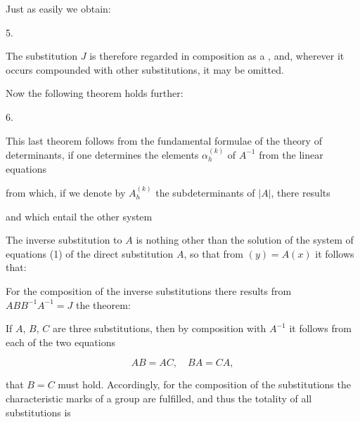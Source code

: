 Just as easily we obtain:

\par
5.\enspace{}

The substitution $J$ is therefore regarded in composition as a , and, wherever it occurs compounded with other substitutions, it may be omitted.

Now the following theorem holds further:

\par
6.\enspace{}



This last theorem follows from the fundamental formulae of the theory of determinants, if one determines the elements $\alpha_h^{(k)}$ of $A^{-1}$ from the linear equations


from which, if we denote by $A_h^{(k)}$ the subdeterminants of $|A|$, there results


and which entail the other system


The inverse substitution to $A$ is nothing other than the solution of the system of equations (1) of the direct substitution $A$, so that from $(y) = A(x)$ it follows that:


For the composition of the inverse substitutions there results from $ABB^{-1}A^{-1} = J$ the theorem:


If $A$, $B$, $C$ are three substitutions, then by composition with $A^{-1}$ it follows from each of the two equations

\[
AB = AC, \quad BA = CA,
\]

that $B = C$ must hold. Accordingly, for the composition of the substitutions the characteristic marks of a group are fulfilled, and thus the totality of all substitutions is
